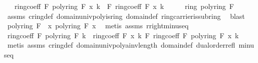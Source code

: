 \begin{isabellebody}
\ \ \ {\isachardoublequoteopen}ring{\isachardot}{\kern0pt}coeff\ F\ {\isacharparenleft}{\kern0pt}{\isasymominus}\isactrlbsub poly{\isacharunderscore}{\kern0pt}ring\ F\isactrlesub \ x{\isacharparenright}{\kern0pt}\ k\ {\isacharequal}{\kern0pt}\ {\isasymominus}\isactrlbsub F\isactrlesub \ ring{\isachardot}{\kern0pt}coeff\ F\ x\ k{\isachardoublequoteclose}\isanewline
%
\isadelimproof
%
\endisadelimproof
%
\isatagproof
{}\isamarkupfalse%
\ {\isacharminus}{\kern0pt}\isanewline
\ \ \isamarkupfalse%
\ ring\ {\isachardoublequoteopen}poly{\isacharunderscore}{\kern0pt}ring\ F{\isachardoublequoteclose}\isanewline
\ \ \ \ \isamarkupfalse%
\ assms\ cring{\isacharunderscore}{\kern0pt}def\ domain{\isachardot}{\kern0pt}univ{\isacharunderscore}{\kern0pt}poly{\isacharunderscore}{\kern0pt}is{\isacharunderscore}{\kern0pt}ring\ domain{\isacharunderscore}{\kern0pt}def\ ring{\isachardot}{\kern0pt}carrier{\isacharunderscore}{\kern0pt}is{\isacharunderscore}{\kern0pt}subring\ \isamarkupfalse%
\ blast\isanewline
\ \ \isamarkupfalse%
\ {\isachardoublequoteopen}{\isasymzero}\isactrlbsub poly{\isacharunderscore}{\kern0pt}ring\ F\isactrlesub \ {\isacharequal}{\kern0pt}\ x\ {\isasymominus}\isactrlbsub poly{\isacharunderscore}{\kern0pt}ring\ F\isactrlesub \ x{\isachardoublequoteclose}\ \isamarkupfalse%
\ {\isacharparenleft}{\kern0pt}metis\ assms{\isacharparenleft}{\kern0pt}{}{\isacharparenright}{\kern0pt}\ r{\isacharunderscore}{\kern0pt}right{\isacharunderscore}{\kern0pt}minus{\isacharunderscore}{\kern0pt}eq{\isacharparenright}{\kern0pt}\isanewline
\ \ \isamarkupfalse%
\ {\isachardoublequoteopen}ring{\isachardot}{\kern0pt}coeff\ F\ {\isacharparenleft}{\kern0pt}{\isasymzero}\isactrlbsub poly{\isacharunderscore}{\kern0pt}ring\ F\isactrlesub {\isacharparenright}{\kern0pt}\ k\ {\isacharequal}{\kern0pt}\ ring{\isachardot}{\kern0pt}coeff\ F\ x\ k\ {\isasymoplus}\isactrlbsub F\isactrlesub \ ring{\isachardot}{\kern0pt}coeff\ F\ {\isacharparenleft}{\kern0pt}{\isasymominus}\isactrlbsub poly{\isacharunderscore}{\kern0pt}ring\ F\isactrlesub \ x{\isacharparenright}{\kern0pt}\ k{\isachardoublequoteclose}\isanewline
\ \ \ \ \isamarkupfalse%
\ {\isacharparenleft}{\kern0pt}metis\ assms\ cring{\isacharunderscore}{\kern0pt}def\ domain{\isachardot}{\kern0pt}univ{\isacharunderscore}{\kern0pt}poly{\isacharunderscore}{\kern0pt}a{\isacharunderscore}{\kern0pt}inv{\isacharunderscore}{\kern0pt}length\ domain{\isacharunderscore}{\kern0pt}def\ dual{\isacharunderscore}{\kern0pt}order{\isachardot}{\kern0pt}refl\ minus{\isacharunderscore}{\kern0pt}eq\ \isanewline

\end{isabellebody}
